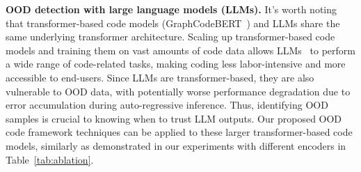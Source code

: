 
\textbf{OOD detection with large language models (LLMs).} It's worth noting that transformer-based code models (\eg GraphCodeBERT~\cite{guo2020graphcodebert}) and LLMs share the same underlying transformer architecture. Scaling up transformer-based code models and training them on vast amounts of code data allows LLMs~\cite{roziere2023code} to perform a wide range of code-related tasks, making coding less labor-intensive and more accessible to end-users. Since LLMs are transformer-based, they are also vulnerable to OOD data, with potentially worse performance degradation due to error accumulation during auto-regressive inference. Thus, identifying OOD samples is crucial to knowing when to trust LLM outputs. Our proposed OOD code framework techniques can be applied to these larger transformer-based code models, similarly as demonstrated in our experiments with different encoders in Table~\ref{tab:ablation}.



